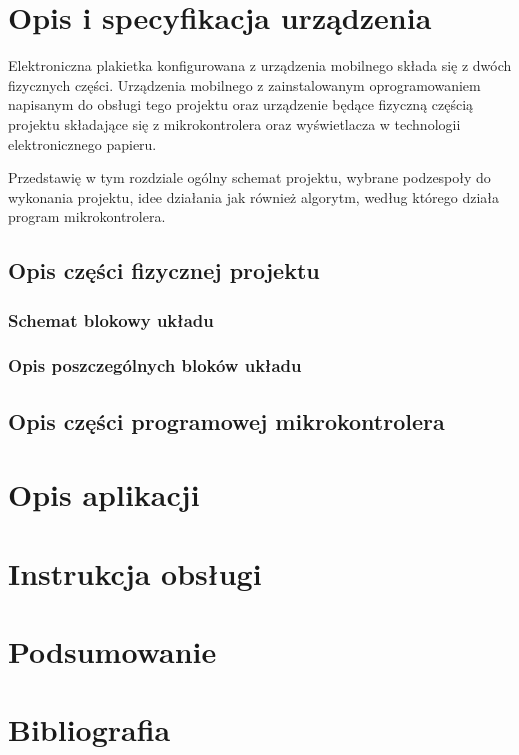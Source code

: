 \documentclass[a4paper,12pt, twoside]{article}
\begin{document}
	\section{Opis i specyfikacja urządzenia}
	Elektroniczna plakietka konfigurowana z urządzenia mobilnego składa się z dwóch fizycznych części. Urządzenia mobilnego z zainstalowanym oprogramowaniem napisanym do obsługi tego projektu oraz urządzenie będące fizyczną częścią projektu składające się z mikrokontrolera oraz wyświetlacza w technologii elektronicznego papieru.

    Przedstawię w tym rozdziale ogólny schemat projektu, wybrane podzespoły do wykonania projektu, idee działania jak również algorytm, według którego działa program mikrokontrolera.
    
    \subsection{Opis części fizycznej projektu}
    \subsubsection{Schemat blokowy układu}
    \subsubsection{Opis poszczególnych bloków układu}
    \subsection{Opis części programowej mikrokontrolera}
	
	
	
	
	\section{Opis aplikacji}
	\section{Instrukcja obsługi}
	\section{Podsumowanie}
	
	\newpage
	\section{Bibliografia}
	
\end{document}
